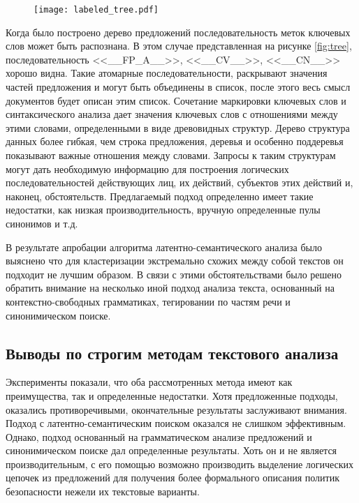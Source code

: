 \documentclass[../main]{subfiles}
\begin{document}
\begin{figure}[H]
    \centering
    {\texttt{[image: labeled\_tree.pdf]}}
    \vspace{-\baselineskip}
\end{figure}

Когда было построено дерево предложений последовательность меток ключевых слов может быть распознана. В этом случае представленная на рисунке \ref{fig:tree}, последовательность <<\_\_FP\_A\_\_>>, <<\_\_CV\_\_>>, <<\_\_CN\_\_>> хорошо видна. Такие атомарные последовательности, раскрывают значения частей предложения и могут быть объединены в список, после этого весь смысл документов будет описан этим список. Сочетание маркировки ключевых слов и синтаксического анализа дает значения ключевых слов с отношениями между этими словами, определенными в виде древовидных структур. Дерево структура данных более гибкая, чем строка предложения, деревья и особенно поддеревья показывают важные отношения между словами. Запросы к таким структурам могут дать необходимую информацию для построения логических последовательностей действующих лиц, их действий, субъектов этих действий и, наконец, обстоятельств. Предлагаемый подход определенно имеет такие недостатки, как низкая производительность, вручную определенные пулы синонимов и т.д.


В результате апробации алгоритма латентно-семантического анализа было выяснено что для кластеризации экстремально схожих между собой текстов он  подходит не лучшим образом. В связи с этими обстоятельствами было решено обратить внимание на несколько иной подход анализа текста, основанный на контекстно-свободных грамматиках, тегировании по частям речи и синонимическом поиске.

\subsection{Выводы по строгим методам текстового анализа}

Эксперименты показали, что оба рассмотренных метода имеют как преимущества, так и определенные недостатки. Хотя предложенные подходы, оказались противоречивыми, окончательные результаты заслуживают внимания. Подход с латентно-семантическим поиском оказался не слишком эффективным. Однако, подход основанный на грамматическом анализе предложений и синонимическом поиске дал определенные результаты. Хоть он и не является производительным, с его помощью возможно производить выделение логических цепочек из предложений для получения более формального описания политик безопасности нежели их текстовые варианты.
\end{document}
